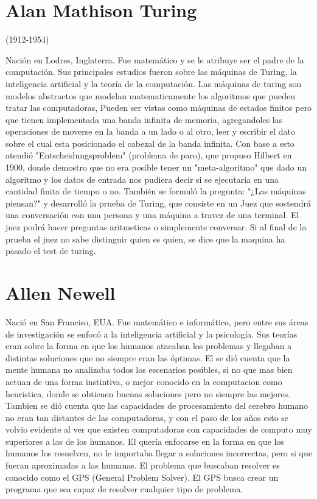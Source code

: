 \section{Alan Mathison Turing}

	(1912-1954)

	Nación en Lodres, Inglaterra. Fue matemático y se le atribuye ser el padre de la computación. Sus principales estudios fueron
	sobre las máquinas de Turing, la inteligencia artificial y la teoría de la computación. Las máquinas de turing son modelos abstractos
	que modelan matematicamente los algoritmos que pueden tratar las computadoras, Pueden ser vistas como máquinas de estados finitos pero
	que tienen implementada una banda infinita de memoria, agregandoles las operaciones de moverse en la banda a un lado o al otro, leer y escribir el dato sobre el cual esta posicionado el cabezal de la banda infinita. Con base a esto atendió "Entscheidungsproblem" (problema de paro), que propuso Hilbert en 1900, donde demostro que no era posible tener un "meta-algoritmo" que dado un algoritmo y los datos de entrada nos pudiera decir si se ejecutaría en una cantidad finita de tiempo o no. También se formuló la pregunta: "¿Las máquinas piensan?" y desarrolló la prueba de Turing, que consiste en un Juez que sostendrá una conversación con una persona y una máquina a travez de una terminal. El juez podrá hacer preguntas aritmeticas o simplemente conversar. Si al final de la prueba el juez no sabe distinguir quien es quien, se dice que la maquina ha pasado el test de turing. 

\section{Allen Newell}
	
	Nació en San Franciso, EUA. Fue matemático e informático, pero entre sus áreas de investigación se enfocó a la inteligencia artificial y la psicología. Sus teorías eran sobre la forma en que los humanos atacaban los problemas y llegaban a distintas soluciones que no siempre eran las óptimas. El se dió cuenta que la mente humana no analizaba todos los escenarios posibles, si no que mas bien actuan de una forma instintiva, o mejor conocido en la computacion como heuristica, donde se obtienen buenas soluciones pero no siempre las mejores. Tambien se dió cuenta que las capacidades de procesamiento del cerebro humano no eran tan distantes de las computadoras, y con el paso de los años esto se volvio evidente al ver que existen computadoras con capacidades de computo muy superiores a las de los humanos. El quería enfocarse en la forma en que los humanos los resuelven, no le importaba llegar a soluciones incorrectas, pero si que fueran aproximadas a las humanas. El problema que buscaban resolver es conocido como el GPS (General Problem Solver). El GPS busca crear un programa que sea capaz de resolver cualquier tipo de problema. 
	


